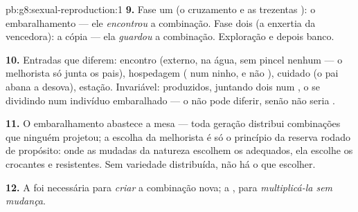 \begin{solution}{pb:g8:sexual-reproduction:1}
\textbf{9.} Fase um (o cruzamento e as trezentas ): o
embaralhamento --- ele \emph{encontrou} a combinação. Fase dois (a
enxertia da vencedora): a cópia --- ela \emph{guardou} a combinação.
Exploração e depois banco.

\textbf{10.} Entradas que diferem: encontro (externo, na água, sem
pincel nenhum --- o melhorista só junta os pais), hospedagem ( num
ninho, e não ), cuidado (o pai abana a desova), estação.
Invariável:  produzidos,  juntando dois num , o
 se dividindo num indivíduo embaralhado --- o  não pode
diferir, senão não seria .

\textbf{11.} O embaralhamento abastece a mesa --- toda geração
distribui combinações que ninguém projetou; a escolha da melhorista é
só o princípio da reserva rodado de propósito: onde as 
mudadas da natureza escolhem os adequados, ela escolhe os crocantes e
resistentes. Sem variedade distribuída, não há o que escolher.

\textbf{12.} A  foi necessária para \emph{criar} a
combinação nova; a , para \emph{multiplicá-la sem
mudança}.
\end{solution}

